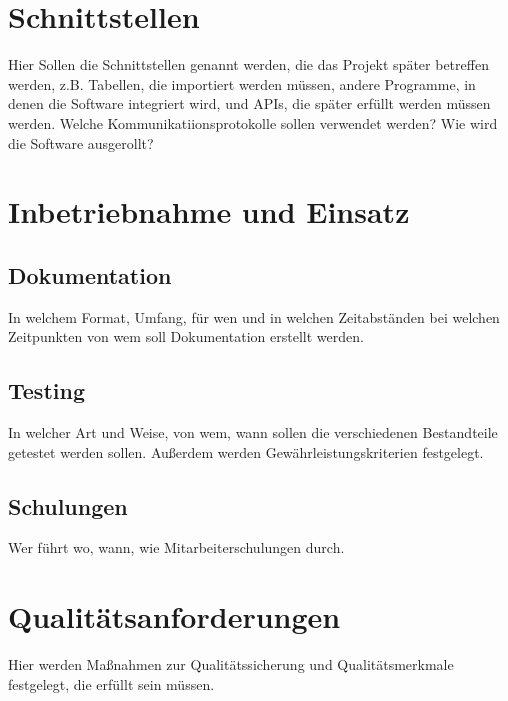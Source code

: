 \documentclass[a4paper, 12pt]{article}
\begin{document}
    \section{Schnittstellen}
    Hier Sollen die Schnittstellen genannt werden, die das Projekt später betreffen werden, 
    z.B. Tabellen, die importiert werden müssen, andere Programme, in denen die Software 
    integriert wird, und APIs, die später erfüllt werden müssen werden.
    Welche Kommunikatiionsprotokolle sollen verwendet werden?
    Wie wird die Software ausgerollt?

    \section{Inbetriebnahme und Einsatz}
    \subsection{Dokumentation}
    In welchem Format, Umfang, für wen und in welchen Zeitabständen bei welchen Zeitpunkten von wem 
    soll Dokumentation erstellt werden.
    \subsection{Testing}
    In welcher Art und Weise, von wem, wann sollen die verschiedenen Bestandteile getestet werden sollen.
    Außerdem werden Gewährleistungskriterien festgelegt.
    \subsection{Schulungen}
    Wer führt wo, wann, wie Mitarbeiterschulungen durch.
    \section{Qualitätsanforderungen}
    Hier werden Maßnahmen zur Qualitätssicherung und Qualitätsmerkmale festgelegt, die erfüllt sein müssen.
\end{document}
